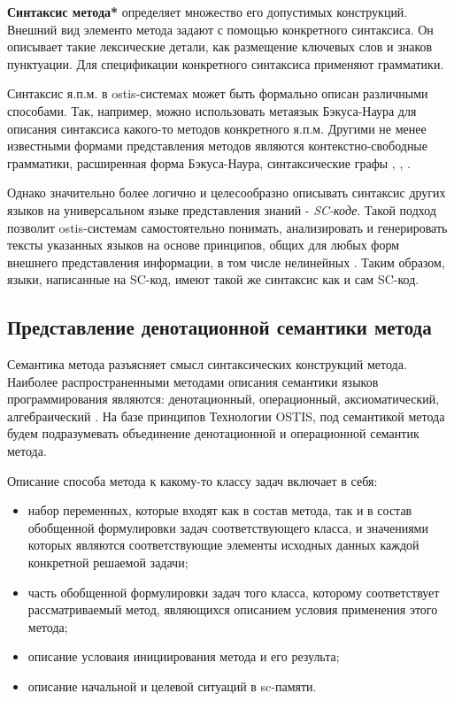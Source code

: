 \textbf{Синтаксис метода*} определяет множество его допустимых конструкций. Внешний вид элементо метода задают с помощью конкретного синтаксиса. Он описывает такие лексические детали, как размещение ключевых слов и знаков пунктуации. Для спецификации конкретного синтаксиса применяют грамматики.

Синтаксис я.п.м. в ostis-системах может быть формально описан различными способами. Так, например, можно использовать метаязык Бэкуса-Наура для описания синтаксиса какого-то методов конкретного я.п.м. Другими не менее известными формами представления методов являются контекстно-свободные грамматики, расширенная форма Бэкуса-Наура, синтаксические графы \cite{Sebesta2012}, \cite{Scott2006}, \cite{Scott1972}.

Однако значительно более логично и целесообразно описывать синтаксис других языков на универсальном языке представления знаний - \textit{SC-коде}. Такой подход позволит ostis-системам самостоятельно понимать, анализировать и генерировать тексты указанных языков на основе принципов, общих для любых форм внешнего представления информации, в том числе нелинейных \cite{Petrov1978}. Таким образом, языки, написанные на SC-код, имеют такой же синтаксис как и сам SC-код.

\subsection{Представление денотационной семантики метода}

Семантика метода разъясняет смысл синтаксических конструкций метода. Наиболее распространенными методами описания семантики языков программирования являются: денотационный, операционный, аксиоматический, алгебраический \cite{Orlov2013}. На базе принципов Технологии OSTIS, под семантикой метода будем подразумевать объединение денотационной и операционной семантик метода.

Описание способа  метода к какому-то классу задач включает в себя:
\begin{itemize}
    \item набор переменных, которые входят как в состав метода, так и в состав обобщенной формулировки задач соответствующего класса, и значениями которых являются соответствующие элементы исходных данных каждой конкретной решаемой задачи;
    \item часть обобщенной формулировки задач того класса, которому соответствует рассматриваемый метод, являющихся описанием условия применения этого метода;
    \item описание условаия инициирования метода и его результа;
    \item описание начальной и целевой ситуаций в sc-памяти.
\end{itemize}

